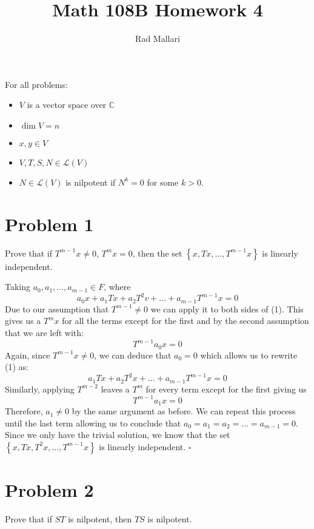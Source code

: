 \documentclass[12pt]{article}
\title{Math 108B Homework 4}
\author{Rad Mallari}
\newcommand{\C}{\mathbb{C}}
\newcommand{\set}[1]{\left\{ #1\right\}}
\newenvironment{proof}{\noindent{\bf Proof.}}{\hfill $\square$\medskip}
\begin{document}
\maketitle
For all problems:
\begin{itemize}
    \setlength{\itemindent}{2em}
    \item $V$ is a vector space over $\C$
    \item $\dim V=n$
    \item $x,y\in V$
    \item $V,T,S,N\in\mathcal{L}(V)$
    \item $N\in\mathcal{L}(V)$ is nilpotent if $N^{k}=0$ for some $k>0$.
\end{itemize}

\section{Problem 1}
Prove that if $T^{m-1}x\neq 0$, $T^{m}x=0$, then the set $\set{x,Tx,...,T^{m-1}x}$ is linearly independent.

\begin{proof}
    Taking $a_{0},a_{1},...,a_{m-1}\in F$, where
    \begin{equation}
        a_{0}x+a_{1}Tx+a_{2}T^{2}v+...+a_{m-1}T^{m-1}x=0
    \end{equation}
    Due to our assumption that $T^{m-1}\neq0$ we can apply it to both sides of (1). This gives us a $T^{m}x$ for all the terms except for the first and by the second assumption that we are left with:
    $$T^{m-1}a_{0}x=0$$
    Again, since $T^{m-1}x\neq0$, we can deduce that $a_{0}=0$ which allows us to rewrite (1) as:
    \begin{equation}
        a_{1}Tx+a_{2}T^{2}x+...+a_{m-1}T^{m-1}x=0
    \end{equation}
    Similarly, applying $T^{m-2}$ leaves a $T^{m}$ for every term except for the first giving us
    $$T^{m-1}a_{1}x=0$$
    Therefore, $a_{1}\neq0$ by the same argument as before. We can repeat this process until the last term allowing us to conclude that $a_{0}=a_{1}=a_{2}=...=a_{m-1}=0$. Since we only have the trivial solution, we know that the set $\set{x,Tx,T^{2}x,...,T^{m-1}x}$ is linearly independent.
\end{proof}


\section{Problem 2}
Prove that if $ST$ is nilpotent, then $TS$ is nilpotent.
\end{document}
